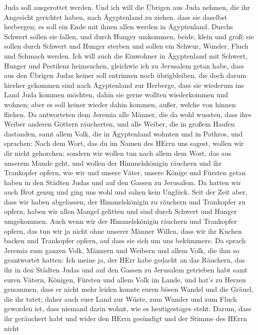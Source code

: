 Juda soll ausgerottet werden.  Und ich will die Übrigen aus
Juda nehmen, die ihr Angesicht gerichtet haben, nach Ägyptenland zu
ziehen, dass sie daselbst herbergen; es soll ein Ende mit ihnen allen
werden in Ägyptenland. Durchs Schwert sollen sie fallen, und durch
Hunger umkommen, beide, klein und groß; sie sollen durch Schwert und
Hunger sterben und sollen ein Schwur, Wunder, Fluch und Schmach werden.
 Ich will auch die Einwohner in Ägyptenland mit Schwert,
Hunger und Pestilenz heimsuchen, gleichwie ich zu Jerusalem getan habe,
 dass aus den Übrigen Judas keiner soll entrinnen noch
übrigbleiben, die doch darum hierher gekommen sind nach Ägyptenland zur
Herberge, dass sie wiederum ins Land Juda kommen möchten, dahin sie
gerne wollten wiederkommen und wohnen; aber es soll keiner wieder dahin
kommen, außer, welche von hinnen fliehen.  Da antworteten
dem Jeremia alle Männer, die da wohl wussten, dass ihre Weiber anderen
Göttern räucherten, und alle Weiber, die in großem Haufen dastanden,
samt allem Volk, die in Ägyptenland wohnten und in Pathros, und
sprachen:  Nach dem Wort, das du im Namen des HErrn uns
sagest, wollen wir dir nicht gehorchen;  sondern wir wollen
tun nach allem dem Wort, das aus unserem Munde geht, und wollen der
Himmelskönigin räuchern und ihr Trankopfer opfern, wie wir und unsere
Väter, unsere Könige und Fürsten getan haben in den Städten Judas und
auf den Gassen zu Jerusalem. Da hatten wir auch Brot genug und ging uns
wohl und sahen kein Unglück.  Seit der Zeit aber, dass wir
haben abgelassen, der Himmelskönigin zu räuchern und Trankopfer zu
opfern, haben wir allen Mangel gelitten und sind durch Schwert und
Hunger umgekommen.  Auch wenn wir der Himmelskönigin
räuchern und Trankopfer opfern, das tun wir ja nicht ohne unserer Männer
Willen, dass wir ihr Kuchen backen und Trankopfer opfern, auf dass sie
sich um uns bekümmere.  Da sprach Jeremia zum ganzen Volk,
Männern und Weibern und allem Volk, die ihm so geantwortet hatten:
 Ich meine ja, der HErr habe gedacht an das Räuchern, das
ihr in den Städten Judas und auf den Gassen zu Jerusalem getrieben habt
samt euren Vätern, Königen, Fürsten und allem Volk im Lande, und hat's
zu Herzen genommen,  dass er nicht mehr leiden konnte euren
bösen Wandel und die Gräuel, die ihr tatet; daher auch euer Land zur
Wüste, zum Wunder und zum Fluch geworden ist, dass niemand darin wohnt,
wie es heutigestages steht.  Darum, dass ihr geräuchert
habt und wider den HErrn gesündigt und der Stimme des HErrn nicht
